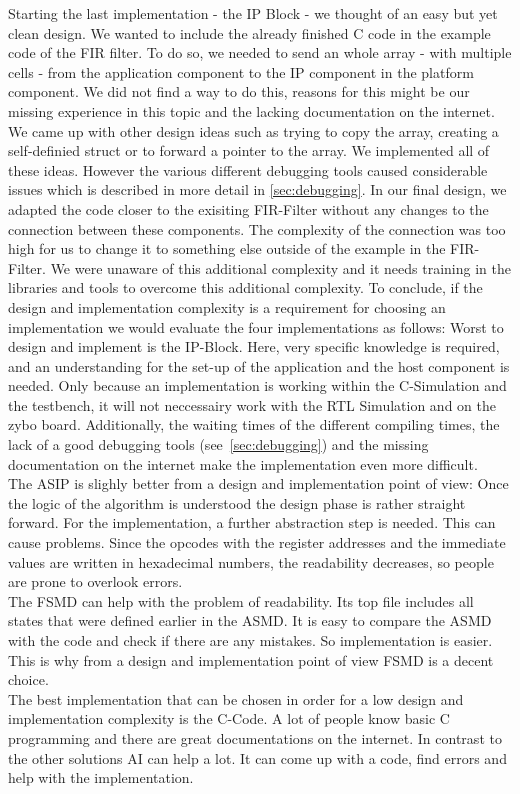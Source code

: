 \documentclass[conference]{IEEEtran}
\begin{document}
Starting the last implementation - the IP Block - we thought of an easy but yet clean design. We wanted to include the already finished C code in the example code of the FIR filter. To do so, we needed to send an whole array - with multiple cells - from the application component to the IP component in the platform component. We did not find a way to do this, reasons for this might be our missing experience in this topic and the lacking documentation on the internet. We came up with other design ideas such as trying to copy the array, creating a self-definied struct or to forward a pointer to the array. We implemented all of these ideas. However the various different debugging tools caused considerable issues which is described in more detail in \ref*{sec:debugging}. In our final design, we adapted the code closer to the exisiting FIR-Filter without any changes to the connection between these components. The complexity of the connection was too high for us to change it to something else outside of the example in the FIR-Filter. We were unaware of this additional complexity and it needs training in the libraries and tools to overcome this additional complexity.
To conclude, if the design and implementation complexity is a requirement for choosing an implementation we would evaluate the four implementations as follows:
Worst to design and implement is the IP-Block. Here, very specific knowledge is required, and an understanding for the set-up of the application and the host component is needed. Only because an implementation is working within the C-Simulation and the testbench, it will not neccessairy work with the RTL Simulation and on the zybo board. Additionally, the waiting times of the different compiling times, the lack of a good debugging tools (see~\ref{sec:debugging}) and the missing documentation on the internet make the implementation even more difficult.\\
The ASIP is slighly better from a design and implementation point of view: Once the logic of the algorithm is understood the design phase is rather straight forward. For the implementation, a further abstraction step is needed. This can cause problems. Since the opcodes with the register addresses and the immediate values are written in hexadecimal numbers, the readability decreases, so people are prone to overlook errors.\\
The FSMD can help with the problem of readability. Its top file includes all states that were defined earlier in the ASMD. It is easy to compare the ASMD with the code and check if there are any mistakes. So implementation is easier. This is why from a design and implementation point of view FSMD is a decent choice.\\
The best implementation that can be chosen in order for a low design and implementation complexity is the C-Code. A lot of people know basic C programming and there are great documentations on the internet. In contrast to the other solutions AI can help a lot. It can come up with a code, find errors and help with the implementation.\\
\end{document}

